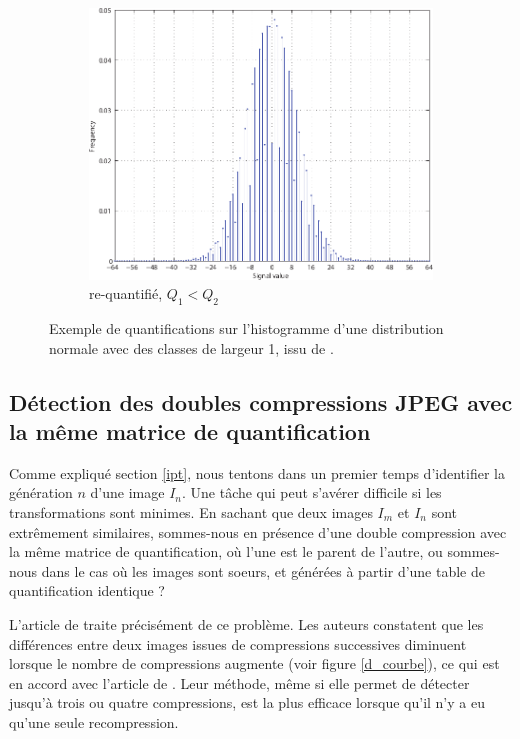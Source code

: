 \documentclass[utf8,final]{stageM2R} %
\begin{document}
\begin{figure}
\begin{subfigure}{.33\textwidth}
    \includegraphics[width=\linewidth]{images/h3}
    \caption{re-quantifié, $Q_{1} < Q_{2}$}
    \label{hc}
  \end{subfigure}
  \caption{Exemple de quantifications sur l'histogramme d'une distribution normale avec des classes de largeur 1, issu de \autocite{feng2010jpeg}.}
  \label{fig:histo}
\end{figure}

\subsection{Détection des doubles compressions JPEG avec la même matrice de quantification}
Comme expliqué section \ref{ipt}, nous tentons dans un premier temps d'identifier la génération $n$ d'une image $I_{n}$. Une tâche qui peut s'avérer difficile si les transformations sont minimes. En sachant que deux images $I_{m}$ et $I_{n}$ sont extrêmement similaires, sommes-nous en présence d'une double compression avec la même matrice de quantification, où l'une est le parent de l'autre, ou sommes-nous dans le cas où les images sont soeurs, et générées à partir d'une table de quantification identique ?

L'article de  \autocite{huang2010detecting} traite précisément de ce problème. Les auteurs constatent que les différences entre deux images issues de compressions successives diminuent lorsque le nombre de compressions augmente (voir figure \ref{d_courbe}), ce qui est en accord avec l'article de  \autocite{lai2013block}. Leur méthode, même si elle permet de détecter jusqu'à trois ou quatre compressions, est la plus efficace lorsque qu'il n'y a eu qu'une seule recompression.
\end{document}
